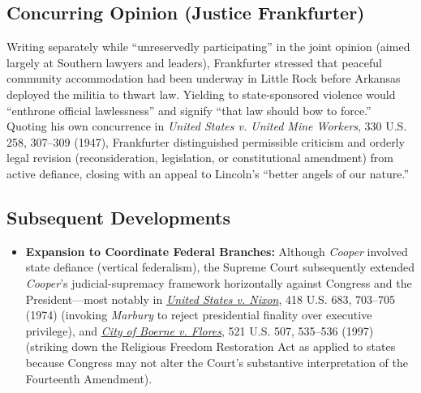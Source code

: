 \documentclass[12pt]{article}
\begin{document}
\subsection{Concurring Opinion (Justice Frankfurter)}

Writing separately while ``unreservedly participating'' in the joint opinion (aimed largely at Southern lawyers and leaders), Frankfurter stressed that peaceful community accommodation had been underway in Little Rock before Arkansas deployed the militia to thwart law. Yielding to state-sponsored violence would ``enthrone official lawlessness'' and signify ``that law should bow to force.'' Quoting his own concurrence in \textit{United States v. United Mine Workers}, 330 U.S. 258, 307--309 (1947), Frankfurter distinguished permissible criticism and orderly legal revision (reconsideration, legislation, or constitutional amendment) from active defiance, closing with an appeal to Lincoln's ``better angels of our nature.''

\subsection{Subsequent Developments}

\begin{itemize}
  \item \textbf{Expansion to Coordinate Federal Branches:} Although \textit{Cooper} involved state defiance (vertical federalism), the Supreme Court subsequently extended \textit{Cooper}'s judicial-supremacy framework horizontally against Congress and the President---most notably in \href{https://supreme.justia.com/cases/federal/us/418/683/}{\textit{United States v. Nixon}}, 418 U.S. 683, 703--705 (1974) (invoking \textit{Marbury} to reject presidential finality over executive privilege), and \href{https://supreme.justia.com/cases/federal/us/521/507/}{\textit{City of Boerne v. Flores}}, 521 U.S. 507, 535--536 (1997) (striking down the Religious Freedom Restoration Act as applied to states because Congress may not alter the Court's substantive interpretation of the Fourteenth Amendment).

\end{itemize}
\end{document}
